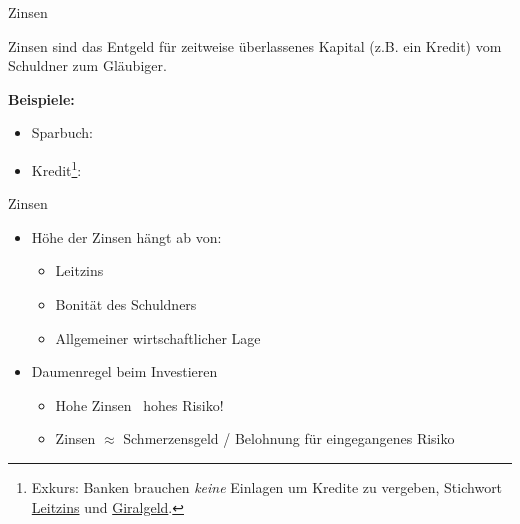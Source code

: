 \documentclass{beamer}
\begin{document}
			\begin{frame}{Zinsen}
				\begin{definition}
					Zinsen sind das Entgeld für zeitweise überlassenes Kapital (z.B. ein Kredit) vom Schuldner zum Gläubiger.
				\end{definition}\pause
				\textbf{Beispiele:}
				\begin{multicols}{2}
					\begin{itemize}
						\item Sparbuch:\\
						\pause
						\columnbreak
						\item Kredit\footnote{Exkurs: Banken brauchen \textit{keine} Einlagen um Kredite zu vergeben, Stichwort \href{https://de.wikipedia.org/wiki/Leitzins}{Leitzins} und \href{https://de.wikipedia.org/wiki/Buchgeld}{Giralgeld}.}:\\
					\end{itemize}
				\end{multicols}
			\end{frame}
		
			\begin{frame}{Zinsen}
				\begin{itemize}
					\item Höhe der Zinsen hängt ab von:
					\begin{itemize}
						\item Leitzins
						\item Bonität des Schuldners
						\item Allgemeiner wirtschaftlicher Lage
					\end{itemize}
					\item Daumenregel beim Investieren
					\begin{itemize}
						\item Hohe Zinsen \textrightarrow\ hohes Risiko!
						\item Zinsen $\approx$ Schmerzensgeld / Belohnung für eingegangenes Risiko
					\end{itemize}
				\end{itemize}
			\end{frame}
		
\end{document}
